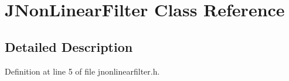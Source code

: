 \hypertarget{class_j_non_linear_filter}{}\section{J\+Non\+Linear\+Filter Class Reference}
\label{class_j_non_linear_filter}


\subsection{Detailed Description}


Definition at line 5 of file jnonlinearfilter.\+h.

